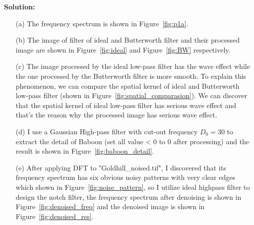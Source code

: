 \documentclass[11pt,letterpaper]{article}
\begin{document}
\textbf{Solution:}
\begin{itemize}
	\item [(a)] The frequency spectrum is shown in Figure~\ref{fig:p1a}.
	\item [(b)] The image of filter of ideal and Butterworth filter and their processed image are shown in Figure~\ref{fig:ideal} and Figure~\ref{fig:BW} respectively.
	\item [(c)] The image processed by the ideal low-pass filter has the wave effect while the one processed by the Butterworth filter is more smooth.
				To explain this phenomenon, we can compare the spatial kernel of ideal and Butterworth low-pass filter (shown in Figure~\ref{fig:spatial_comparasion}).
				We can discover that the spatial kernel of ideal low-pass filter has serious wave effect and that's the reason why the processed image has serious wave effect.
	\item [(d)] I use a Gaussian High-pass filter with cut-out frequency $D_0=30$ to extract the detail of Baboon (set all value < 0 to 0 after processing) and the result is shown in Figure~\ref{fig:baboon_detail}.
	\item [(e)] After applying DFT to "Goldhill\_noised.tif", I discovered that its frequency spectrum has six obvious noisy patterns with very clear edges which shown in Figure~\ref{fig:noise_pattern},
				so I utilize ideal highpass filter to design the notch filter, the frequency spectrum after denoising is shown in Figure~\ref{fig:denoised_freq} and the denoised image is shown in Figure~\ref{fig:denoised_res}.		
\end{itemize}
\end{document}
